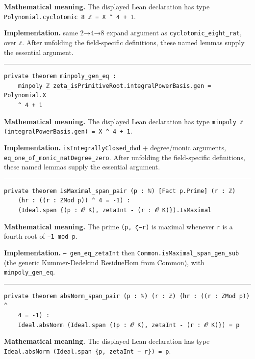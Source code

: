 \documentclass[UTF8,a4paper,11pt,fontset=fandol]{ctexart}
\theoremstyle{definition}
\newcommand{\statementsep}{\par\medskip\hrule\medskip}
\begin{document}
\noindent\textbf{Mathematical meaning.} The displayed Lean declaration has type \texttt{Polynomial.\allowbreak{}cyclotomic 8 ℤ = X \textasciicircum{} 4 + 1}.\par
\noindent\textbf{Implementation.} same 2→4→8 expand argument as \texttt{cyclotomic\_\allowbreak{}eight\_\allowbreak{}rat}, over \texttt{ℤ}. After unfolding the field-specific definitions, these named lemmas supply the essential argument.\par
\statementsep
\begin{verbatim}
private theorem minpoly_gen_eq :
    minpoly ℤ zeta_isPrimitiveRoot.integralPowerBasis.gen = Polynomial.X
    ^ 4 + 1
\end{verbatim}
\noindent\textbf{Mathematical meaning.} The displayed Lean declaration has type \texttt{minpoly ℤ (integralPowerBasis.\allowbreak{}gen) = X \textasciicircum{} 4 + 1}.\par
\noindent\textbf{Implementation.} \texttt{isIntegrallyClosed\_\allowbreak{}dvd} + degree/monic arguments, \texttt{eq\_\allowbreak{}one\_\allowbreak{}of\_\allowbreak{}monic\_\allowbreak{}natDegree\_\allowbreak{}zero}. After unfolding the field-specific definitions, these named lemmas supply the essential argument.\par
\statementsep
\begin{verbatim}
private theorem isMaximal_span_pair (p : ℕ) [Fact p.Prime] (r : ℤ)
    (hr : ((r : ZMod p)) ^ 4 = -1) :
    (Ideal.span {(p : 𝓞 K), zetaInt - (r : 𝓞 K)}).IsMaximal
\end{verbatim}
\noindent\textbf{Mathematical meaning.} The prime \texttt{(p, ζ−r)} is maximal whenever \texttt{r} is a fourth root of \texttt{−1 mod p}.\par
\noindent\textbf{Implementation.} \texttt{← gen\_\allowbreak{}eq\_\allowbreak{}zetaInt} then \texttt{Common.\allowbreak{}isMaximal\_\allowbreak{}span\_\allowbreak{}gen\_\allowbreak{}sub} (the generic Kummer-Dedekind ResidueHom from Common), with \texttt{minpoly\_\allowbreak{}gen\_\allowbreak{}eq}.\par
\statementsep
\begin{verbatim}
private theorem absNorm_span_pair (p : ℕ) (r : ℤ) (hr : ((r : ZMod p)) ^
    4 = -1) :
    Ideal.absNorm (Ideal.span {(p : 𝓞 K), zetaInt - (r : 𝓞 K)}) = p
\end{verbatim}
\noindent\textbf{Mathematical meaning.} The displayed Lean declaration has type \texttt{Ideal.\allowbreak{}absNorm (Ideal.\allowbreak{}span \{p, zetaInt − r\}) = p}.\par
\end{document}
